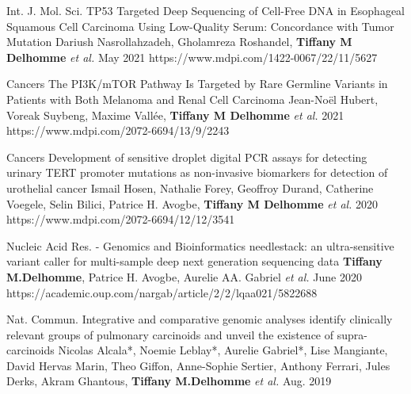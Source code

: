 \begin{cventries}
  
    \cvpublicationentry
   	{Int. J. Mol. Sci.} %
    {TP53 Targeted Deep Sequencing of Cell-Free DNA in Esophageal Squamous Cell Carcinoma Using Low-Quality Serum: Concordance with Tumor Mutation} %
    {Dariush Nasrollahzadeh, Gholamreza Roshandel, \textbf{Tiffany M Delhomme} \textit{et al.}} %
    {}
    {May 2021} %
    {https://www.mdpi.com/1422-0067/22/11/5627}
    
    \cvpublicationentry
   	{Cancers} %
    {The PI3K/mTOR Pathway Is Targeted by Rare Germline Variants in Patients with Both Melanoma and Renal Cell Carcinoma} %
    {Jean-Noël Hubert, Voreak Suybeng, Maxime Vallée, \textbf{Tiffany M Delhomme} \textit{et al.}} %
    {}
    { 2021} %
    {https://www.mdpi.com/2072-6694/13/9/2243}
    
    \cvpublicationentry
   	{Cancers} %
    {Development of sensitive droplet digital PCR assays for detecting urinary TERT promoter mutations as non-invasive biomarkers for detection of urothelial cancer} %
    {Ismail Hosen, Nathalie Forey, Geoffroy Durand, Catherine Voegele, Selin Bilici, Patrice H. Avogbe, \textbf{Tiffany M Delhomme} \textit{et al.}} %
    {}
    {2020} %
    {https://www.mdpi.com/2072-6694/12/12/3541}
    
    \cvpublicationentry
    {Nucleic Acid Res. - Genomics and Bioinformatics} %
    {needlestack: an ultra-sensitive variant caller for multi-sample deep next generation sequencing data} %
    {\textbf{Tiffany M.Delhomme}, Patrice H. Avogbe, Aurelie AA. Gabriel \textit{et al.}} %
    {}
    {June 2020} %
    {https://academic.oup.com/nargab/article/2/2/lqaa021/5822688}
    
    \cvpublicationentry
    {Nat. Commun.} %
    {Integrative and comparative genomic analyses identify clinically relevant groups of pulmonary carcinoids and unveil the existence of supra-carcinoids} %
    {Nicolas Alcala*, Noemie Leblay*, Aurelie Gabriel*, Lise Mangiante, David Hervas Marin, Theo Giffon, Anne-Sophie Sertier, Anthony Ferrari, Jules Derks, Akram Ghantous, \textbf{Tiffany M.Delhomme} \textit{et al.}} %
    {}
    {Aug. 2019} %
    {}


\end{cventries}
